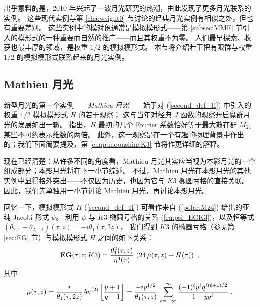 \documentclass[11pt,a4paper,fontset=windows]{ctexart}
\numberwithin{equation}{section}
\newcommand{\MM}{\mathbb{M}}
\def\inf{\infty}
\def\m{\mu}
\def\t{\tau}
\def\th{\theta}
\newcommand{\be}{\begin{equation}}
\newcommand{\ee}{\end{equation}}
\newcommand{\eq}[1]{(\ref{#1})}
\begin{document}

出乎意料的是，2010 年兴起了一波月光研究的热潮，由此发现了更多月光联系的实例。
这些现代实例与第 \ref{cha:weight0} 节讨论的经典月光实例有相似之处，但也有重要差别。
这些实例中的模对象通常是模拟模形式——第 \ref{subsec:MMF} 节引入的模形式的一种重要而自然的推广——而且其权重不为零。
人们最早探索、收获也最丰厚的领域，是权重 $1/2$ 的模拟模形式。
本节将介绍若干把有限群与权重 $1/2$ 的模拟模形式联系起来的月光实例。

\subsection{Mathieu 月光}
\label{subsec:Mathieu}

新型月光的第一个实例——\emph{Mathieu 月光}——始于对 (\ref{second_def_H}) 中引入的权重 $1/2$ 模拟模形式 $H$ 的若干观察；
这与当年对经典 $J$ 函数的观察开启魔群月光的发展如出一辙。
\cite{Eguchi2010} 指出，$H$ 最初的几个 Fourier 系数恰好等于最大散在群 $M_{24}$ 某些不可约表示维数的两倍。
此外，这一观察是在一个有趣的物理背景中作出的；我们下面简要提及，第 \ref{chap:moonshineK3} 节将作更详细的解释。


现在已经清楚：从许多不同的角度看，Mathieu 月光其实应当视为本影月光的一个组成部分；本影月光将在下一小节综述。
不过，Mathieu 月光在本影月光的其他实例中显得格外突出——不仅因为历史，也因为它与 $K3$ 椭圆亏格的直接关联。
因此，我们先单独用一小节讨论 Mathieu 月光，再讨论本影月光。

回忆一下，模拟模形式 $H$ \eq{second_def_H} 可看作来自 (\ref{polar:M24}) 给出的亚纯 Jacobi 形式 $\psi$。
利用 $\psi$ 与 $K3$ 椭圆亏格的关系 (\ref{eq:psi_EGK3})，以及恒等式 $(\theta_{2,1}-\th_{2,-1})(\t,z) =-i \theta_1(\t,2z)$，
我们得到 $K3$ 的椭圆亏格（参见第 \ref{sec:EG} 节）与模拟模形式 $H$ 之间的如下关系：
\be\label{splitEGM24}
{\bf EG}(\t,z;K3) =  \frac{\th_1^2(\t,z)}{\eta^3(\t)} \,\left(24 \,\m(\t,z) + H(\t)\right)~, 
\ee
其中
\be\label{def:mu}
\m(\t,z) = {i \over \theta_{1}(\t,2z)}  {\rm Av}^{(2)}\left[{y+1\over y-1}\right] = \frac{-i y^{1/2}}{\th_{1}(\t,z)}\,\sum_{\ell=-\inf}^\inf \frac{(-1)^{\ell} y^\ell q^{\ell(\ell+1)/2}}{1-y q^\ell}~.
\ee
\end{document}
